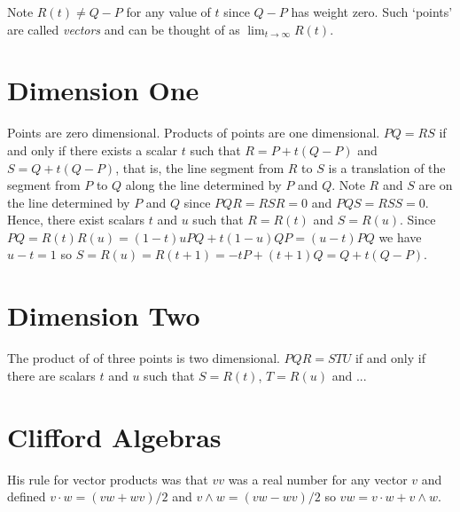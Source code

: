 Note $R(t) \not= Q - P$ for any value of $t$ since $Q - P$ has weight
zero. Such `points' are called {\em vectors} and can be thought of
as $\lim_{t\to\infty}R(t)$.

\section{Dimension One}
Points are zero dimensional. Products of points are one dimensional.
$PQ = RS$ if and only if there exists a scalar $t$ such that $R = P +
t(Q - P)$ and $S = Q + t(Q - P)$, that is, the line segment from $R$
to $S$ is a translation of the segment from $P$ to $Q$ along the line
determined by $P$ and $Q$. Note $R$ and $S$ are on the line
determined by $P$ and $Q$ since $PQR = RSR = 0$ and $PQS = RSS = 0$.
Hence, there exist scalars $t$ and $u$ such that $R = R(t)$ and $S =
R(u)$.  Since $PQ = R(t)R(u) = (1-t)uPQ + t(1-u)QP = (u - t)PQ$ we have
$u - t = 1$ so $S = R(u) = R(t + 1) = -tP + (t + 1)Q = Q + t(Q - P)$.

\section{Dimension Two}
The product of of three points is two dimensional. $PQR = STU$ if
and only if there are scalars $t$ and $u$ such that
$S = R(t)$, $T = R(u)$ and ...

\section{Clifford Algebras}
His rule for vector products was that $vv$ was a real number
for any vector $v$ and defined $v\cdot w = (vw + wv)/2$ and
$v\wedge w = (vw - wv)/2$ so $vw = v\cdot w + v\wedge w$.
